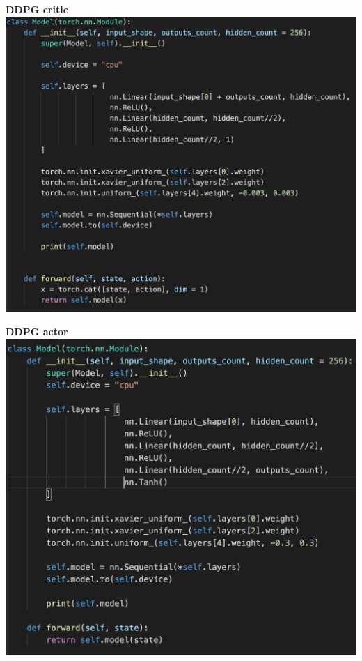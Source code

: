 \documentclass[xcolor=dvipsnames]{beamer}
\begin{document}
\begin{frame}{\bf DDPG critic}
  {\centering \includegraphics[scale=0.4]{../images/ddpg_critic.png}}
\end{frame}

\begin{frame}{\bf DDPG actor}
  {\centering \includegraphics[scale=0.4]{../images/ddpg_actor.png}}
\end{frame}
\end{document}
